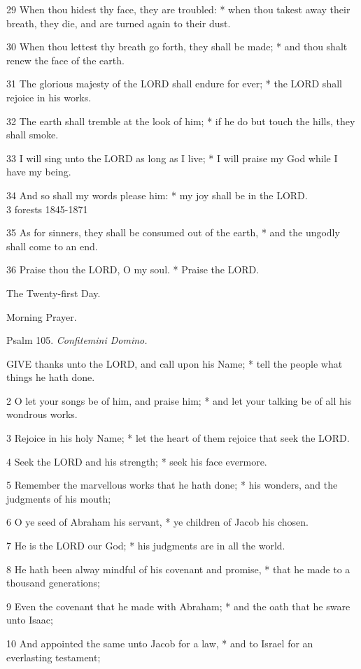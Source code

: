 29 When thou hidest thy face, they are troubled: * when
thou takest away their breath, they die, and are turned again to their dust.

30 When thou lettest thy breath go forth, they shall
be made; * and thou shalt renew the face of the earth.

31 The glorious majesty of the LORD shall endure for
ever; * the LORD shall rejoice in his works.

32 The earth shall tremble at the look of him; * if he
do but touch the hills, they shall smoke.

33 I will sing unto the LORD as long as I live; * I will
praise my God while I have my being.

34 And so shall my words please him: * my joy shall be
in the LORD. \\
3
forests 1845-1871

35 As for sinners, they shall be consumed out of the earth, * and
the ungodly shall come to an end.

36 Praise thou the LORD, O my soul. * Praise the LORD.

The
Twenty-first Day.

Morning
Prayer.

Psalm
105. \emph{Confitemini Domino.}

GIVE
thanks unto the LORD, and call upon his Name; * tell the people what things
he hath done.

2 O let your songs be of him, and praise him; * and
let your talking be of all his wondrous works.

3 Rejoice in his holy Name; * let the heart of them
rejoice that seek the LORD.

4 Seek the LORD and his strength; * seek his face evermore.

5 Remember the marvellous works that he hath done;
* his wonders, and the judgments of his mouth;

6 O ye seed of Abraham his servant, * ye children of
Jacob his chosen.

7 He is the LORD our God; * his judgments are in all
the world.

8 He hath been alway mindful of his covenant and promise,
* that he made to a thousand generations;

9 Even the covenant that he made with Abraham; * and
the oath that he sware unto Isaac;

10 And appointed the same unto Jacob for a law, * and
to Israel for an everlasting testament;


